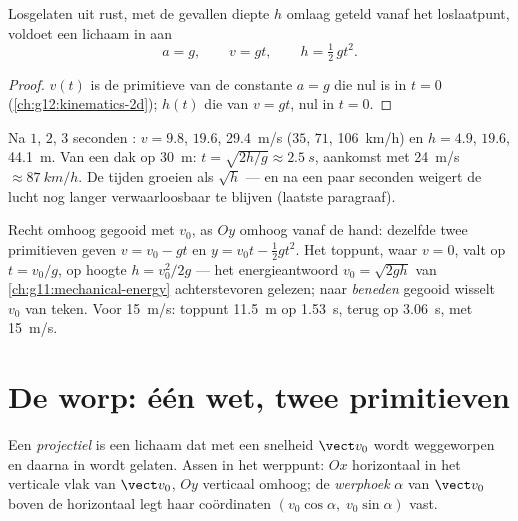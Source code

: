 \begin{proposition}\label{prop:g12:projectile-motion:vertical}
Losgelaten uit rust, met de gevallen diepte $h$ omlaag geteld vanaf het
loslaatpunt, voldoet een lichaam in  aan
\[
a = g, \qquad v = g t, \qquad h = \tfrac12\, g t^2 .
\]
\end{proposition}

\begin{proof}
$v(t)$ is de primitieve van de constante $a = g$ die nul is in $t = 0$
(\cref{ch:g12:kinematics-2d}); $h(t)$ die van $v = gt$, nul in $t = 0$.
\end{proof}

\begin{example}[Ordegrootten]\label{ex:g12:projectile-motion:orders}
Na $1$, $2$, $3$ seconden : $v = 9.8$, $19.6$, \qty{29.4}{m/s}
($35$, $71$, \qty{106}{km/h}) en $h = 4.9$, $19.6$, \qty{44.1}{m}. Van een
dak op \qty{30}{m}: $t = \sqrt{2h/g} \approx \qty{2.5}{s}$, aankomst met
\qty{24}{m/s} $\approx \qty{87}{km/h}$. De tijden groeien als $\sqrt h$ ---
en na een paar seconden weigert de lucht nog langer verwaarloosbaar te
blijven (laatste paragraaf).
\end{example}

\begin{example}\label{ex:g12:projectile-motion:throw}
Recht omhoog gegooid met $v_0$, as $Oy$ omhoog vanaf de hand: dezelfde twee
primitieven geven $v = v_0 - gt$ en $y = v_0 t - \tfrac12 gt^2$. Het toppunt,
waar $v = 0$, valt op $t = v_0/g$, op hoogte $h = v_0^2/2g$ --- het
energieantwoord $v_0 = \sqrt{2gh}$ van \cref{ch:g11:mechanical-energy}
achterstevoren gelezen; naar \emph{beneden} gegooid wisselt $v_0$ van teken.
Voor \qty{15}{m/s}: toppunt \qty{11.5}{m} op \qty{1.53}{s}, terug op
\qty{3.06}{s}, met \qty{15}{m/s}.
\end{example}

\section{De worp: één wet, twee primitieven}

\begin{definition}[Projectiel]\label{def:g12:projectile-motion:projectile}
Een \emph{projectiel} is een lichaam dat met een snelheid
$\vect v_0$ wordt weggeworpen en daarna in  wordt gelaten. Assen in
het werppunt: $Ox$ horizontaal in het verticale vlak van $\vect v_0$, $Oy$
verticaal omhoog; de \emph{werphoek} $\alpha$ van $\vect v_0$
boven de horizontaal legt haar coördinaten
$(v_0\cos\alpha,\; v_0\sin\alpha)$ vast.
\end{definition}

